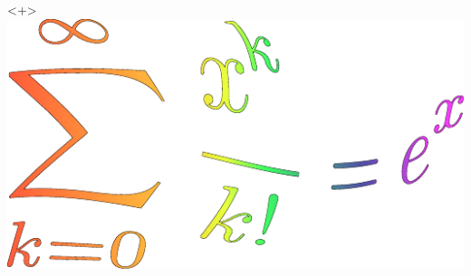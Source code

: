 \begin{frame}
\begin{onlyenv}
    \end{onlyenv}
    \begin{onlyenv}<+>
        \includegraphics[width=\textwidth,height=0.8\textheight,keepaspectratio]{assets/formulaArt.pdf}
    \end{onlyenv}
\end{frame}
